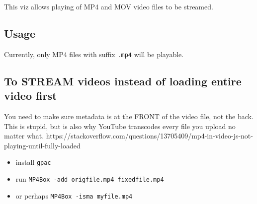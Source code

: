 This viz allows playing of MP4 and MOV video files to be streamed.

\hypertarget{usage}{%
\subsection{Usage}\label{usage}}

Currently, only MP4 files with suffix \texttt{.mp4} will be playable.

\hypertarget{to-stream-videos-instead-of-loading-entire-video-first}{%
\subsection{To STREAM videos instead of loading entire video
first}\label{to-stream-videos-instead-of-loading-entire-video-first}}

You need to make sure metadata is at the FRONT of the video file, not
the back. This is stupid, but is also why YouTube transcodes every file
you upload no matter what.
https://stackoverflow.com/questions/13705409/mp4-in-video-js-not-playing-until-fully-loaded

\begin{itemize}
\tightlist
\item
  install \texttt{gpac}
\item
  run \texttt{MP4Box\ -add\ origfile.mp4\ fixedfile.mp4}
\item
  or perhaps \texttt{MP4Box\ -isma\ myfile.mp4}
\end{itemize}
